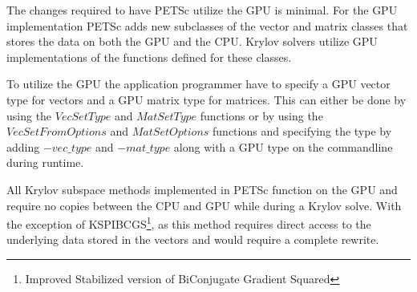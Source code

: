 The changes required to have PETSc utilize the GPU is minimal. For the GPU 
implementation PETSc adds new subclasses of the vector and matrix classes that 
stores the data on both the GPU and the CPU. Krylov solvers utilize GPU implementations 
of the functions defined for these classes.

To utilize the GPU the application programmer have to specify a GPU vector type 
for vectors and a GPU matrix type for matrices. This can either be done by using 
the $VecSetType$ and $MatSetType$ functions or by using the $VecSetFromOptions$ 
and $MatSetOptions$ functions and specifying the type by adding $-vec\_type$ and 
$-mat\_type$ along with a GPU type on the commandline during runtime. 

All Krylov subspace methods implemented in PETSc function on the GPU and require 
no copies between the CPU and GPU while during a Krylov solve. With the exception 
of KSPIBCGS\footnote{Improved Stabilized version of BiConjugate Gradient Squared},
as this method requires direct access to the underlying data stored in the vectors 
and would require a complete rewrite.

